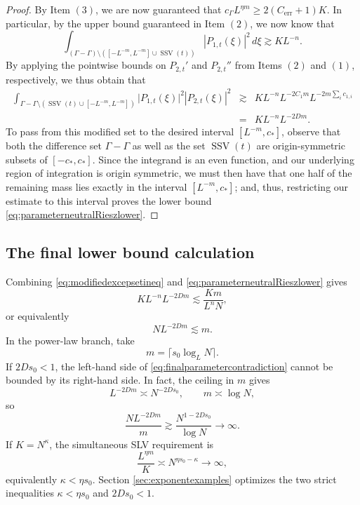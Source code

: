 \documentclass[12pt]{amsart}
\numberwithin{equation}{section}
\begin{document}
\begin{proof}
By Item $(3)$, we are now guaranteed that
$c_{\Gamma}L^{\eta m}\geq2(C_{\mathrm{err}}+1)K$. In particular, by the upper bound guaranteed in Item $(2)$, we now know that  
\[
 \int_{(\Gamma-\Gamma)\setminus
  ([-L^{-m},L^{-m}]\cup\operatorname{SSV}(t))}
 |P_{1,t}(\xi)|^2\,d\xi
 \gtrsim KL^{-n}.
\]
By applying the pointwise bounds on $P_{2,t}'$ and $P_{2,t}''$ from Items $(2)$ and $(1)$, respectively, we thus obtain that
\begin{eqnarray*}
 \int_{\Gamma - \Gamma \setminus (\operatorname{SSV}(t) \cup [-L^{-m}, L^{-m}])}\lvert P_{1,t} (\xi)\rvert^2 |P_{2,t}(\xi)|^2
 & \gtrsim &  K L^{-n} L^{-2C_1m}L^{-2m\sum_i c_{1,i}} \\[1ex]
 & = & K L^{-n} L^{-2Dm}.
\end{eqnarray*}
To pass from this modified set to the desired interval $[L^{-m}, c_*]$, observe that both the difference set $\Gamma-\Gamma$ as well as the set $\operatorname{SSV}(t)$ are origin-symmetric subsets of $[-c_*, c_*]$. Since the integrand is an even function, and our underlying region of integration is origin symmetric, we must then have that
one half of the remaining mass lies exactly in the interval $[L^{-m},c_*]$; and, thus, restricting our estimate to this interval proves the lower bound
\eqref{eq:parameterneutralRieszlower}.
\end{proof}

\subsection{The final lower bound calculation}

Combining \eqref{eq:modifiedexcepsetineq} and
\eqref{eq:parameterneutralRieszlower} gives
\[
 KL^{-n}L^{-2Dm}
 \lesssim\frac{Km}{L^nN},
\]
or equivalently
\begin{equation}\label{eq:finalparametercontradiction}
 N L^{-2Dm}\lesssim m.
\end{equation}
In the power-law branch, take
\[
 m=\lceil s_0\log_LN\rceil.
\]
If $2Ds_0<1$, the left-hand side of
\eqref{eq:finalparametercontradiction} cannot be bounded by its right-hand
side.  In fact, the ceiling in $m$ gives
\[
 L^{-2Dm}\asymp N^{-2Ds_0},
 \qquad m\asymp\log N,
\]
so
\[
 \frac{NL^{-2Dm}}m
 \gtrsim\frac{N^{1-2Ds_0}}{\log N}\longrightarrow\infty.
\]
If $K=N^\kappa$, the simultaneous SLV requirement is
\[
 \frac{L^{\eta m}}K
 \asymp N^{\eta s_0-\kappa}\longrightarrow\infty,
\]
equivalently $\kappa<\eta s_0$.  Section \ref{sec:exponentexamples}
optimizes the two strict inequalities $\kappa<\eta s_0$ and $2Ds_0<1$.
\end{document}
